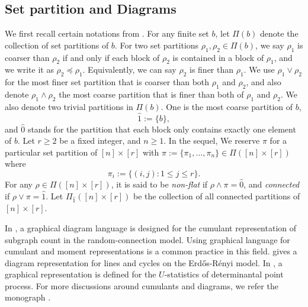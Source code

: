 \documentclass[12pt]{article}
\numberwithin{equation}{section}
\begin{document}
\subsection*{Set partition and Diagrams}
\noindent 
We first recall certain notations from \cite{LiuPrivault23a,peccati2011}. For any finite set $b$, let $\Pi(b)$ denote the collection of set partitions of $b$. For two set partitions $\rho_1,\rho_2\in\Pi(b)$, we say $\rho_1$ is coarser than $\rho_2$ if and only if each block of $\rho_2$ is contained in a block of $\rho_1$, and we write it as $\rho_2\preceq\rho_1$. Equivalently, we can say $\rho_2$ is finer than $\rho_1$. We use $\rho_1\vee\rho_2$ for the most finer set partition that is coarser than both $\rho_1$ and $\rho_2$, and also denote $\rho_1\wedge\rho_2$ the most coarse partition that is finer than both of $\rho_1$ and $\rho_2$. We also denote two trivial partitions in $\Pi(b)$. One is the most coarse partition of $b$, 
$$\widehat{1}:=\{b\},$$
and $\widehat{0}$ stands for the partition that each block only contains exactly one element of $b$. Let $r\ge2$ be a fixed integer, and $n\ge1$. In the sequel, We reserve $\pi$ for a particular set partition of $[n]\times[r]$ with $\pi:=\{\pi_1,\dots,\pi_n\}\in\Pi([n]\times[r])$ where 
$$\pi_i:=\{(i,j):1\le j\le r\}.$$
For any $\rho\in\Pi([n]\times[r])$, it is said to be {\it non-flat} if $\rho\wedge\pi=\widehat{0}$, and {\it connected} if $\rho\vee\pi=\widehat{1}$. Let $\Pi_{\widehat{1}}([n]\times[r])$ be the collection of all connected partitions of $[n]\times[r]$. 

In \cite{LiuPrivault23a}, a graphical diagram language is designed for the cumulant representation of subgraph count in the random-connection model. Using graphical language for cumulant and moment representations is a common practice in this field. \cite{khorunzhiy08} gives a diagram representation for lines and cycles on the Erd{\H o}s-R\'enyi model. In \cite{FGY23}, a graphical representation is defined for the $U$-statistics of determinantal point process. For more discussions around cumulants and diagrams, we refer the monograph \cite{peccati2011}.
\end{document}
